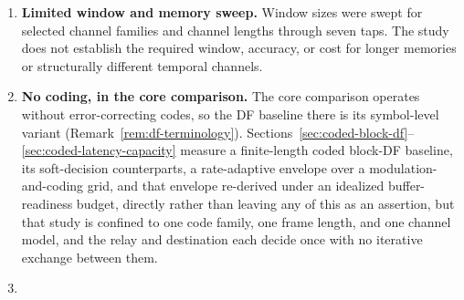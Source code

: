 \begin{enumerate}
\item
  \textbf{Limited window and memory sweep.} Window sizes were swept for selected channel families and channel lengths through seven taps. The study does not establish the required window, accuracy, or cost for longer memories or structurally different temporal channels.
\item
  \textbf{No coding, in the core comparison.} The core comparison operates without error-correcting codes, so the DF baseline there is its symbol-level variant (Remark~\ref{rem:df-terminology}).   Sections~\ref{sec:coded-block-df}--\ref{sec:coded-latency-capacity} measure a finite-length coded block-DF baseline, its soft-decision counterparts, a rate-adaptive envelope over a modulation-and-coding grid, and that envelope re-derived under an idealized buffer-readiness budget, directly rather than leaving any of this as an assertion, but that study is confined to one code family, one frame length, and one channel model, and the relay and destination each decide once with no iterative exchange between them.
\item

\end{enumerate}
